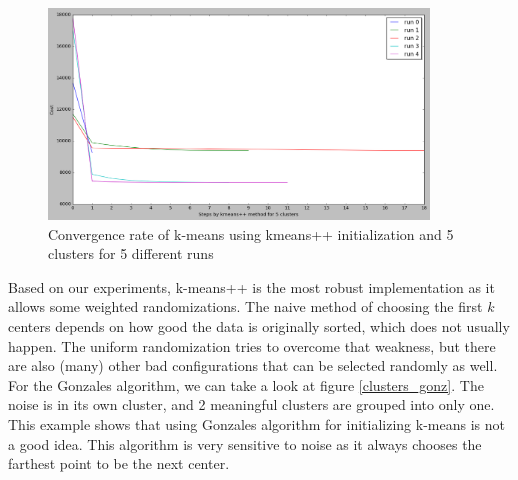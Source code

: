 \begin{figure}[!htb]
\centering
\includegraphics[width=0.9\textwidth]{shots/kmeans++5clusters.png}
\caption{ Convergence rate of k-means using kmeans++ initialization and 5 clusters for 5 different runs }
\label{kmeans++5clusters}
\end{figure}

Based on our experiments, k-means++ is the most robust implementation as it allows some weighted randomizations. The naive method of choosing the first $k$ centers depends on how good the data is originally sorted, which does not usually happen. The uniform randomization tries to overcome that weakness, but there are also (many) other bad configurations that can be selected randomly as well. For the Gonzales algorithm, we can take a look at figure \ref{clusters_gonz}. The noise is in its own cluster, and 2 meaningful clusters are grouped into only one. This example shows that using Gonzales algorithm for initializing k-means is not a good idea. This algorithm is very sensitive to noise as it always chooses the farthest point to be the next center.

